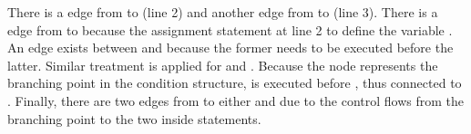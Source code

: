 There is a  edge from  to
 (line 2) and another  edge
from  to  (line 3). There is a
 edge from  to
 because the assignment statement at line 2 to
define the variable . An  edge exists
between  and 
because the former needs to be executed before the latter. Similar
treatment is applied for  and
. Because the  node represents the
branching point in the condition structure,  is
executed before , thus connected to . Finally, there
are two  edges from  to either 
and  due to the control flows from the
branching point to the two inside statements.



